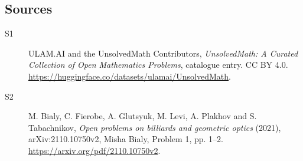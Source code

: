 \documentclass[11pt]{article}
\begin{document}
\subsection{Sources}
\begin{description}
\item[\hypertarget{source:statement:1}{S1}] ULAM.AI and the UnsolvedMath Contributors, \emph{UnsolvedMath: A Curated Collection of Open Mathematics Problems}, catalogue entry. CC BY 4.0. \url{https://huggingface.co/datasets/ulamai/UnsolvedMath}.
\item[\hypertarget{source:statement:2}{S2}] M. Bialy, C. Fierobe, A. Glutsyuk, M. Levi, A. Plakhov and S. Tabachnikov, \emph{Open problems on billiards and geometric optics} (2021), arXiv:2110.10750v2, Misha Bialy, Problem 1, pp. 1--2. \url{https://arxiv.org/pdf/2110.10750v2}.
\end{description}
\label{end:statement}
\end{document}
